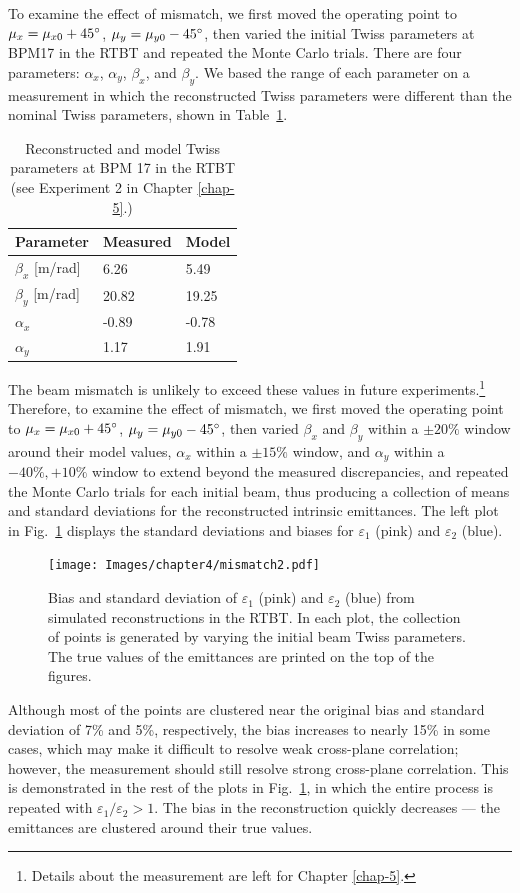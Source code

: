 To examine the effect of mismatch, we first moved the operating point to $\mu_x = \mu_{x0} + 45\degree$, $\mu_y = \mu_{y0} - 45\degree$, then varied the initial Twiss parameters at BPM17 in the RTBT and repeated the Monte Carlo trials. There are four parameters: $\alpha_x$, $\alpha_y$, $\beta_x$, and $\beta_y$. We based the range of each parameter on a measurement in which the reconstructed Twiss parameters were different than the nominal Twiss parameters, shown in Table~\ref{tab:mismatch}.  
%
\begin{table}[!p]
    \centering
    \caption{Reconstructed and model Twiss parameters at BPM 17 in the RTBT (see Experiment 2 in Chapter \ref{chap-5}.)}
    \begin{tabular}{lll}
    \midrule
    \textbf{Parameter} & \textbf{Measured} & \textbf{Model} \\
    \midrule
    $\beta_x$ [m/rad] & 6.26 & 5.49 \\
    $\beta_y$ [m/rad] & 20.82 & 19.25 \\
    $\alpha_x$ & -0.89 & -0.78 \\
    $\alpha_y$ & 1.17 & 1.91 \\
    \midrule    
    \end{tabular}
    \label{tab:mismatch}
\end{table}
%
The beam mismatch is unlikely to exceed these values in future experiments.\footnote{Details about the measurement are left for Chapter \ref{chap-5}.} Therefore, to examine the effect of mismatch, we first moved the operating point to $\mu_x = \mu_{x0} + 45\degree$, $\mu_y = \mu_{y0} - 45\degree$, then varied $\beta_x$ and $\beta_y$ within a $\pm 20\%$ window around their model values, $\alpha_x$ within a $\pm 15\%$ window, and $\alpha_y$ within a $-40\%, +10\%$ window to extend beyond the measured discrepancies, and repeated the Monte Carlo trials for each initial beam, thus producing a collection of means and standard deviations for the reconstructed intrinsic emittances. The left plot in Fig.~\ref{fig:mismatch} displays the standard deviations and biases for $\varepsilon_1$ (pink) and $\varepsilon_2$ (blue).
%
\begin{figure}[!p]
    \centering
    \texttt{[image: Images/chapter4/mismatch2.pdf]}
    \caption{Bias and standard deviation of $\varepsilon_1$ (pink) and $\varepsilon_2$ (blue) from simulated reconstructions in the RTBT. In each plot, the collection of points is generated by varying the initial beam Twiss parameters. The true values of the emittances are printed on the top of the figures.}
    \label{fig:mismatch}
\end{figure}
%
Although most of the points are clustered near the original bias and standard deviation of 7\% and 5\%, respectively, the bias increases to nearly 15\% in some cases, which may make it difficult to resolve weak cross-plane correlation; however, the measurement should still resolve strong cross-plane correlation. This is demonstrated in the rest of the plots in Fig.~\ref{fig:mismatch}, in which the entire process is repeated with $\varepsilon_1 / \varepsilon_2 > 1$. The bias in the reconstruction quickly decreases — the emittances are clustered around their true values. 

